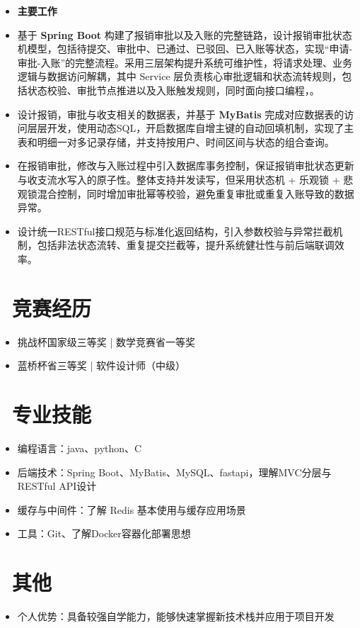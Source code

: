 \documentclass[11pt]{article}
\newlength{\interProjectSpacing}
\newcommand{\projectsep}{\vspace{\interProjectSpacing}}
\newlength{\intraProjectListTopSep}
\begin{document}
\begin{itemize}[nosep, topsep=\intraProjectListTopSep]
    \item \textbf{主要工作}
    \item  基于 \textbf{Spring Boot} 构建了报销审批以及入账的完整链路，设计报销审批状态机模型，包括待提交、审批中、已通过、已驳回、已入账等状态，实现“申请-审批-入账”的完整流程。采用三层架构提升系统可维护性，将请求处理、业务逻辑与数据访问解耦，其中 Service 层负责核心审批逻辑和状态流转规则，包括状态校验、审批节点推进以及入账触发规则，同时面向接口编程，。
    \item  设计报销，审批与收支相关的数据表，并基于 \textbf{MyBatis} 完成对应数据表的访问层层开发，使用动态SQL，开启数据库自增主键的自动回填机制，实现了主表和明细一对多记录存储，并支持按用户、时间区间与状态的组合查询。
    \item  在报销审批，修改与入账过程中引入数据库事务控制，保证报销审批状态更新与收支流水写入的原子性。整体支持并发读写，但采用状态机 + 乐观锁 + 悲观锁混合控制，同时增加审批幂等校验，避免重复审批或重复入账导致的数据异常。
    \item  设计统一RESTful接口规范与标准化返回结构，引入参数校验与异常拦截机制，包括非法状态流转、重复提交拦截等，提升系统健壮性与前后端联调效率。
\end{itemize}

\projectsep
 \section{\makebox[\widthof{\faCogs}][c]{\color{CVBlue}\faCogs}\ 竞赛经历}

\begin{itemize}[nosep]
\item 挑战杯国家级三等奖 | 数学竞赛省一等奖
\item 蓝桥杯省三等奖 | 软件设计师（中级）
\end{itemize}

\section{\makebox[\widthof{\faInfo}][c]{\color{CVBlue}\faInfo}\ 专业技能}

\begin{itemize}[parsep=0.5ex]
\item 编程语言：java、python、C
\item 后端技术：Spring Boot、MyBatis、MySQL、fastapi，理解MVC分层与RESTful API设计
\item 缓存与中间件：了解 Redis 基本使用与缓存应用场景
\item 工具：Git、了解Docker容器化部署思想
\end{itemize}

\section{\makebox[\widthof{\faInfo}][c]{\color{CVBlue}\faInfo}\ 其他}
\begin{itemize}[parsep=0.5ex]
    \item 个人优势：具备较强自学能力，能够快速掌握新技术栈并应用于项目开发
\end{itemize}
\end{document}
